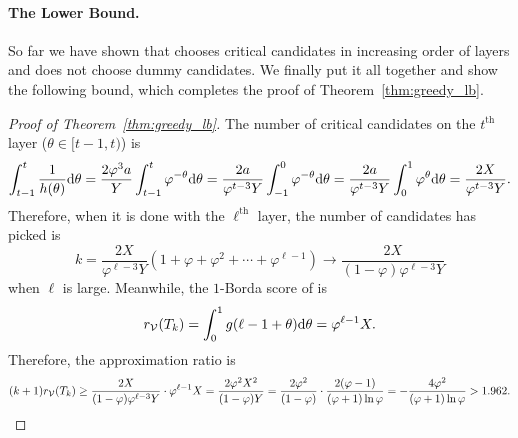 \paragraph{The Lower Bound.} So far we have shown that \g{} chooses critical candidates in increasing order of layers and does not choose dummy candidates. We finally put it all together and show the following bound, which completes the proof of Theorem~\ref{thm:greedy_lb}. 

\begin{proof}[Proof of Theorem~\ref{thm:greedy_lb}]
The number of critical candidates on the $t^{\text{th}}$ layer ($\theta \in [t - 1, t)$) is
\[
\int_{t - 1}^t \frac{1}{h(\theta)} \mathrm{d} \theta = \frac{2 \varphi^3 a}{Y} \int_{t - 1}^t \varphi^{-\theta} \mathrm{d} \theta = \frac{2 a}{\varphi^{t-3} Y} \int_{-1}^0 \varphi^{-\theta} \mathrm{d} \theta  = \frac{2 a}{\varphi^{t-3} Y} \int_{0}^1 \varphi^{\theta} \mathrm{d} \theta = \frac{2 X}{\varphi^{t - 3} Y}.
\]
Therefore, when it is done with the $\ell^{\text{th}}$ layer, the number of candidates \g{} has picked is
\[
k = \frac{2 X}{\varphi^{\ell - 3} Y} (1 + \varphi + \varphi^2 + \cdots + \varphi^{\ell - 1}) \rightarrow \frac{2 X}{(1 - \varphi)\varphi^{\ell - 3} Y}
\]
when $\ell$ is large. Meanwhile, the $1$-Borda score of \g{} is
\[
r_{\mathcal{V}}(T_k) = \int_{0}^1 g(\ell - 1 + \theta) \mathrm{d} \theta = \varphi^{\ell - 1} X.
\]
Therefore, the approximation ratio is
\[
(k+1) r_{\mathcal{V}}(T_k) \ge \frac{2 X}{(1 - \varphi)\varphi^{\ell - 3} Y} \cdot \varphi^{\ell - 1} X = \frac{2 \varphi^2 X^2}{(1 - \varphi) Y} = \frac{2\varphi^2}{(1 - \varphi)} \cdot \frac{2(\varphi - 1)}{(\varphi + 1) \ln \varphi} = -\frac{4 \varphi^2}{(\varphi + 1) \ln \varphi} > 1.962. \qedhere
\]
\end{proof}


